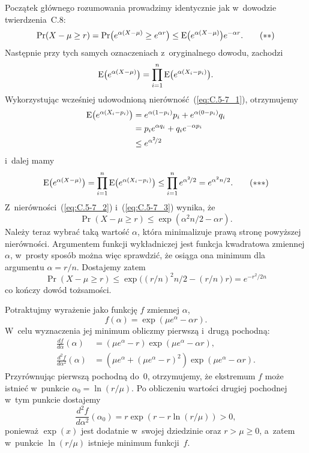 Początek głównego rozumowania prowadzimy identycznie jak w~dowodzie twierdzenia~C.8:
\[
	\Pr(X-\mu\ge r) = \Pr\bigl(e^{\alpha(X-\mu)}\ge e^{\alpha r}\bigr) \le \operatorname{E}\bigl(e^{\alpha(X-\mu)}\bigr)e^{-\alpha r}. \tag{$**$}\label{eq:C.5-7_2}
\]
Następnie przy tych samych oznaczeniach z~oryginalnego dowodu, zachodzi
\[
	\operatorname{E}\bigl(e^{\alpha(X-\mu)}\bigr) = \prod_{i=1}^n\operatorname{E}\bigl(e^{\alpha(X_i-p_i)}\bigr).
\]
Wykorzystując wcześniej udowodnioną nierówność~(\ref{eq:C.5-7_1}), otrzymujemy
\begin{align*}
	\operatorname{E}\bigl(e^{\alpha(X_i-p_i)}\bigr) &= e^{\alpha(1-p_i)}p_i+e^{\alpha(0-p_i)}q_i \\
	&= p_ie^{\alpha q_i}+q_ie^{-\alpha p_i} \\
	&\le e^{\alpha^2\!/2}
\end{align*}
i~dalej mamy
\[
	\E\bigl(e^{\alpha(X-\mu)}\bigr) = \prod_{i=1}^n\E\bigl(e^{\alpha(X_i-p_i)}\bigr) \le \prod_{i=1}^ne^{\alpha^2\!/2} = e^{\alpha^2n/2}. \tag{${**}*$}\label{eq:C.5-7_3}
\]
Z~nierówności~(\ref{eq:C.5-7_2}) i~(\ref{eq:C.5-7_3}) wynika, że
\[
	\Pr(X-\mu\ge r) \le \exp(\alpha^2n/2-\alpha r).
\]
Należy teraz wybrać taką wartość $\alpha$, która minimalizuje prawą stronę powyższej nierówności. Argumentem funkcji wykładniczej jest funkcja kwadratowa zmiennej $\alpha$, w~prosty sposób można więc sprawdzić, że osiąga ona minimum dla argumentu $\alpha=r/n$. Dostajemy zatem
\[
	\Pr(X-\mu\ge r) \le \exp\bigl((r/n)^2n/2-(r/n)r\bigr) = e^{-r^2\!/{2n}}
\]
co kończy dowód tożsamości.

\exercise{} %
Potraktujmy wyrażenie jako funkcję $f$ zmiennej $\alpha$,
\[
	f(\alpha) = \exp(\mu e^\alpha-\alpha r).
\]
W~celu wyznaczenia jej minimum obliczmy pierwszą i~drugą pochodną:
\begin{align*}
	\frac{df}{d\alpha}(\alpha) &= (\mu e^\alpha-r)\exp(\mu e^\alpha-\alpha r), \\
	\frac{d^2\!f}{d\alpha^2}(\alpha) &= \left(\mu e^\alpha+(\mu e^\alpha-r)^2\right)\exp(\mu e^\alpha-\alpha r).
\end{align*}
Przyrównując pierwszą pochodną do~0, otrzymujemy, że ekstremum $f$ może istnieć w~punkcie $\alpha_0=\ln(r/\mu)$. Po obliczeniu wartości drugiej pochodnej w~tym punkcie dostajemy
\[
	\frac{d^2\!f}{d\alpha^2}(\alpha_0) = r\exp(r-r\ln(r/\mu)) > 0,
\]
ponieważ $\exp(x)$ jest dodatnie w~swojej dziedzinie oraz $r>\mu\ge0$, a~zatem w~punkcie $\ln(r/\mu)$ istnieje minimum funkcji~$f$.

\problems


